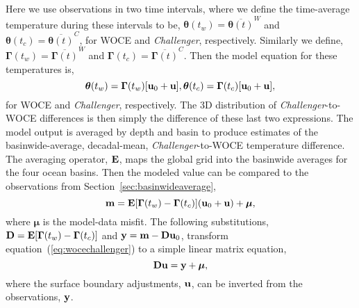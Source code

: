 \documentclass[12pt]{article}
\begin{document}
Here we use observations in two time intervals, where we define the time-average temperature during these intervals to be, ${\boldsymbol \theta}(t_w) = {\overline {\boldsymbol \theta(t)}}^W$ and ${\boldsymbol \theta}(t_c) = {\overline {\boldsymbol \theta(t)}}^C$, for WOCE and {\it Challenger}, respectively. Similarly we define, ${\boldsymbol \Gamma}(t_w) = {\overline {\boldsymbol \Gamma(t)}}^W$ and ${\boldsymbol \Gamma}(t_c) = {\overline {\boldsymbol \Gamma(t)}}^C$.
Then the model equation for these temperatures is,
\begin{equation}
{\boldsymbol \theta}(t_w) = {\boldsymbol \Gamma}(t_w) [{\bf u}_0 + {\bf u}], {\boldsymbol \theta}(t_c) = {\boldsymbol \Gamma}(t_c) [{\bf u}_0 + {\bf u}],
\end{equation}
for WOCE and {\it Challenger}, respectively.
The 3D distribution of {\it Challenger}-to-WOCE differences is then simply the difference of these last two expressions. The model output is averaged by depth and basin to produce estimates of the basinwide-average, decadal-mean, {\it Challenger}-to-WOCE temperature difference. The averaging operator, ${\bf E}$, maps the global grid into the basinwide averages for the four ocean basins. Then the modeled value can be compared to the observations from Section~\ref{sec:basinwideaverage},
\begin{equation}
\label{eq:wocechallenger}
{\bf m} =  {\bf E} [{\boldsymbol \Gamma}(t_w)-{\boldsymbol \Gamma}(t_c)] ( {\bf u}_0 + {\bf u}) + {\boldsymbol \mu}, \end{equation}
where ${\boldsymbol \mu}$ is the model-data misfit. The following substitutions, ${\bf D} = {\bf E} [{\boldsymbol \Gamma}(t_w)-{\boldsymbol \Gamma}(t_c)]$ and ${\bf y} = {\bf m} - {\bf Du}_0$, transform equation~(\ref{eq:wocechallenger}) to a simple linear matrix equation,
\begin{equation}
{\bf D} {\bf u} = {\bf y}  + {\boldsymbol \mu},
\label{eq:linearized}
\end{equation}
where the surface boundary adjustments, ${\bf u}$, can be inverted from the observations, ${\bf y}$.

\end{document}
